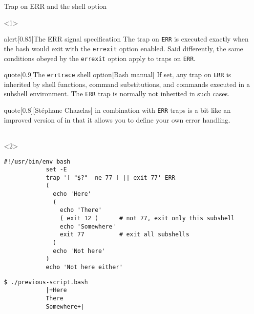 \begin{frame}[fragile]{Trap on ERR and the  shell option}
    \vspace{-2mm}
    \begin{onlyenv}<1>
        \begin{varblock}{alert}[0.85\textwidth]{The ERR signal specification}
            The trap on \texttt{ERR} is executed exactly when the bash would exit with the \texttt{errexit} option enabled.
            Said differently, the same conditions obeyed by the \texttt{errexit} option apply to traps on \texttt{ERR}.
        \end{varblock}
        \begin{varblock}{quote}[0.9\textwidth]{The \;\texttt{errtrace}\; shell option}[Bash manual]
            If set, any trap on \texttt{ERR} is inherited by shell functions, command substitutions, and commands executed in a subshell environment.
            The \texttt{ERR} trap is normally not inherited in such cases.
        \end{varblock}
        \begin{varblock}{quote}[0.8\textwidth]{}[St\'ephane Chazelas]
             in combination with \texttt{ERR} traps is a bit like an improved version of  in that it allows you to define your own error handling.\\[-0.5em] ~
        \end{varblock}
    \end{onlyenv}
    \begin{onlyenv}<2>
        \begin{lstlisting}[style=myBash, aboveskip=2mm]
            #!/usr/bin/env bash
            set -E
            trap '[ "$?" -ne 77 ] || exit 77' ERR
            (
              echo 'Here'
              (
                echo 'There'
                ( exit 12 )      # not 77, exit only this subshell
                echo 'Somewhere'
                exit 77          # exit all subshells
              )
              echo 'Not here'
            )
            echo 'Not here either'
        \end{lstlisting}
        \begin{lstlisting}[style=myBash, aboveskip=2mm, numbers=none]
            $ ./previous-script.bash
            |+Here
            There
            Somewhere+|
        \end{lstlisting}
    \end{onlyenv}
\end{frame}
